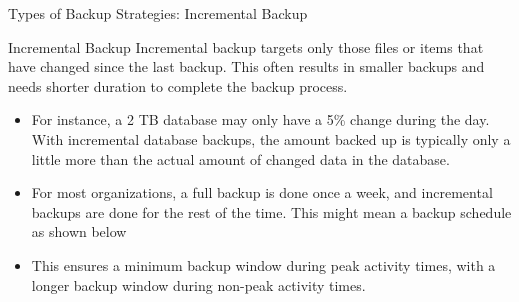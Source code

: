 \documentclass[aspectratio=169, xcolor=dvipsnames]{beamer}
\begin{document}
\begin{frame}{Types of Backup Strategies: Incremental Backup}
    \begin{block}{Incremental Backup}
        Incremental backup targets only those files or items that have changed since the last backup. This often results in smaller backups and needs shorter duration to complete the backup process.
    \end{block}
    \begin{itemize}[<+->]
        \item For instance, a 2 TB database may only have a 5\% change during the day. With incremental database backups, the amount backed up is typically only a little more than the actual amount of changed data in the database.
        \item For most organizations, a full backup is done once a week, and incremental backups are done for the rest of the time. This might mean a backup schedule as shown below
        \item This ensures a minimum backup window during peak activity times, with a longer backup window during non-peak activity times.
    \end{itemize}
\end{frame}
\end{document}
